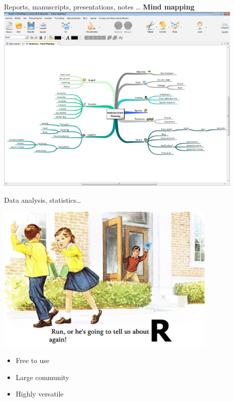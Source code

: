 \documentclass[10pt]{beamer}%
\begin{document}
\begin{frame}{Reports, manuscripts, presentations, notes \dots}
\centering
\textbf{Mind mapping}
\includegraphics[width=0.9\textwidth]{Figures/mindmaps}
\end{frame}

\begin{frame}{Data analysis, statistics\dots }
\begin{center}
\includegraphics[width=0.8\textwidth]{Figures/ralert}
\end{center}
\begin{itemize}
 \item Free to use
\item Large community
\item Highly versatile
\end{itemize}
\end{frame}
\end{document}
